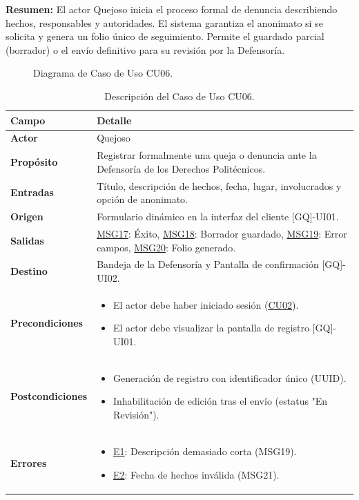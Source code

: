 \begin{appendices}
\textbf{Resumen:} 
El actor Quejoso inicia el proceso formal de denuncia describiendo hechos, responsables y autoridades. El sistema garantiza el anonimato si se solicita y genera un folio único de seguimiento. Permite el guardado parcial (borrador) o el envío definitivo para su revisión por la Defensoría.

\begin{figure}[htbp]
    \centering
    \figCUseis
    \caption{Diagrama de Caso de Uso CU06.}
    \label{fig:cu06}
\end{figure}

\begin{table}[htbp]
\centering
\small
\begin{tabular}{|p{3.5cm}|p{10.5cm}|}
\hline
\rowcolor[HTML]{EFEFEF} 
\textbf{Campo} & \textbf{Detalle} \\ \hline
\textbf{Actor} & Quejoso \\ \hline
\textbf{Propósito} & Registrar formalmente una queja o denuncia ante la Defensoría de los Derechos Politécnicos. \\ \hline
\textbf{Entradas} & Título, descripción de hechos, fecha, lugar, involucrados y opción de anonimato. \\ \hline
\textbf{Origen} & Formulario dinámico en la interfaz del cliente [GQ]-UI01. \\ \hline
\textbf{Salidas} & \hyperlink{msg:MSG17}{MSG17}: Éxito, \hyperlink{msg:MSG18}{MSG18}: Borrador guardado, \hyperlink{msg:MSG19}{MSG19}: Error campos, \hyperlink{msg:MSG20}{MSG20}: Folio generado. \\ \hline
\textbf{Destino} & Bandeja de la Defensoría y Pantalla de confirmación [GQ]-UI02. \\ \hline
\textbf{Precondiciones} & 
\begin{itemize}[nosep, leftmargin=*]
    \item El actor debe haber iniciado sesión (\hyperlink{anexo:casos_uso}{CU02}).
    \item El actor debe visualizar la pantalla de registro [GQ]-UI01.
\end{itemize} \\ \hline
\textbf{Postcondiciones} & 
\begin{itemize}[nosep, leftmargin=*]
    \item Generación de registro con identificador único (UUID).
    \item Inhabilitación de edición tras el envío (estatus "En Revisión").
\end{itemize} \\ \hline
\textbf{Errores} & 
\begin{itemize}[nosep, leftmargin=*]
    \item \hyperlink{err:E10}{E1}: Descripción demasiado corta (MSG19).
    \item \hyperlink{err:E11}{E2}: Fecha de hechos inválida (MSG21).
\end{itemize} \\ \hline
\end{tabular}
\caption{Descripción del Caso de Uso CU06.}
\label{tab:cu06_especificacion}
\end{table}


\end{appendices}
